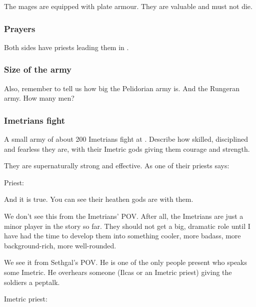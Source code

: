 \begin{garbage}
The \ishrah{} mages are equipped with plate armour. 
They are valuable and must not die. 





\subsubsection{Prayers}
Both sides have priests leading them in . 





\subsubsection{Size of the army}
Also, remember to tell us how big the Pelidorian army is. And the Rungeran army. How many men?





\subsubsection{Imetrians fight}
A small army of about 200 Imetrians fight at \Forklin. 
Describe how skilled, disciplined and fearless they are, with their Imetric gods giving them courage and strength. 

They are supernaturally strong and effective.
As one of their priests says: 

\begin{prose}
  Priest: 
\end{prose}

And it is true. 
You can see their heathen gods are with them. 

We don't see this from the Imetrians' POV. 
After all, the Imetrians are just a minor player in the story so far. 
They should not get a big, dramatic role until I have had the time to develop them into something cooler, more badass, more background-rich, more well-rounded. 

We see it from Sethgal's POV. 
He is one of the only people present who speaks some Imetric. 
He overhears someone (Ilcas or an Imetric priest) giving the soldiers a peptalk. 

\begin{prose}
  Imetric priest: 
  

\end{prose}
\end{garbage}
